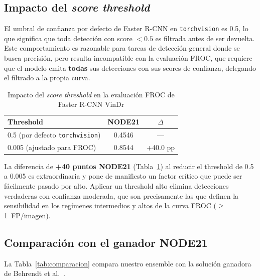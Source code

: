 \documentclass[conference]{IEEEtran}
\begin{document}
\subsection{Impacto del \textit{score threshold}}
\label{sec:threshold}

El umbral de confianza por defecto de Faster R-CNN en \texttt{torchvision}
es 0.5, lo que significa que toda detecci\'{o}n con score $< 0.5$ es filtrada
antes de ser devuelta. Este comportamiento es razonable para tareas de
detecci\'{o}n general donde se busca precisi\'{o}n, pero resulta incompatible
con la evaluaci\'{o}n FROC, que requiere que el modelo emita \textbf{todas}
sus detecciones con sus scores de confianza, delegando el filtrado a la
propia curva.

\begin{table}[t]
\caption{Impacto del \textit{score threshold} en la evaluaci\'{o}n FROC de
Faster R-CNN VinDr}
\label{tab:threshold}
\centering
\footnotesize
\begin{tabular}{lcc}
\toprule
\textbf{Threshold} & \textbf{NODE21} & \textbf{$\Delta$} \\
\midrule
0.5 (por defecto \texttt{torchvision})  & 0.4546 & ---       \\
0.005 (ajustado para FROC)              & 0.8544 & +40.0 pp  \\
\bottomrule
\end{tabular}
\end{table}

La diferencia de \textbf{+40 puntos NODE21} (Tabla~\ref{tab:threshold}) al
reducir el threshold de 0.5 a 0.005 es extraordinaria y pone de manifiesto un
factor cr\'{i}tico que puede ser f\'{a}cilmente pasado por alto. Aplicar un
threshold alto elimina detecciones verdaderas con confianza moderada, que son
precisamente las que definen la sensibilidad en los reg\'{i}menes intermedios y
altos de la curva FROC ($\geq$1~FP/imagen).


\subsection{Comparaci\'{o}n con el ganador NODE21}

La Tabla~\ref{tab:comparacion} compara nuestro ensemble con la soluci\'{o}n
ganadora de Behrendt et al.~\cite{behrendt2023node21}.
\end{document}
